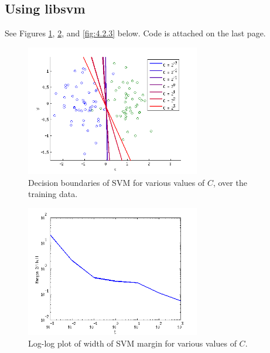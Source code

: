 \documentclass[11pt]{article}
\begin{document}
\subsection{Using libsvm}
See Figures \ref{fig:4.2.1}, \ref{fig:4.2.2}, and \ref{fig:4.2.3} below. Code
is attached on the last page.
\begin{figure}[h!]
\begin{center}
\includegraphics[width=0.68\textwidth]{4_2_1}
\end{center}
\vspace{-9mm}
\caption{Decision boundaries of SVM for various values of $C$, over the
training data.}
\label{fig:4.2.1}
\end{figure}
\begin{figure}[h!]
\begin{center}
\includegraphics[width=0.68\textwidth]{4_2_2}
\end{center}
\vspace{-9mm}
\caption{Log-log plot of width of SVM margin for various values of $C$.}
\label{fig:4.2.2}
\end{figure}
\end{document}
